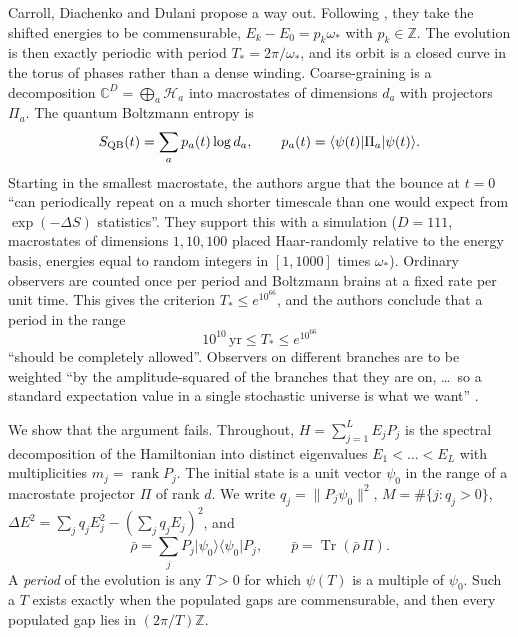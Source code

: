 \documentclass[11pt]{amsart}
\theoremstyle{definition}
\newcommand{\CC}{\mathbb{C}}
\newcommand{\ZZ}{\mathbb{Z}}
\newcommand{\Tr}{\operatorname{Tr}}
\newcommand{\rb}{\bar\rho}
\newcommand{\ket}[1]{\lvert #1\rangle}
\newcommand{\bra}[1]{\langle #1\rvert}
\begin{document}
Carroll, Diachenko and Dulani \cite{CDD26} propose a way out. Following \cite{Car23}, they take the shifted energies to be commensurable, $E_k-E_0=p_k\omega_*$ with $p_k\in\ZZ$. The evolution is then exactly periodic with period $T_*=2\pi/\omega_*$, and its orbit is a closed curve in the torus of phases rather than a dense winding. Coarse-graining is a decomposition $\CC^D=\bigoplus_a\mathcal H_a$ into macrostates of dimensions $d_a$ with projectors $\Pi_a$. The quantum Boltzmann entropy is
\begin{equation}\label{eq:SQB}
S_{\rm QB}(t)=\sum_a p_a(t)\log d_a,\qquad p_a(t)=\langle\psi(t)|\Pi_a|\psi(t)\rangle .
\end{equation}
Starting in the smallest macrostate, the authors argue that the bounce at $t=0$ ``can periodically repeat on a much shorter timescale than one would expect from $\exp(-\Delta S)$ statistics''. They support this with a simulation ($D=111$, macrostates of dimensions $1,10,100$ placed Haar-randomly relative to the energy basis, energies equal to random integers in $[1,1000]$ times $\omega_*$). Ordinary observers are counted once per period and Boltzmann brains at a fixed rate per unit time. This gives the criterion $T_*\le e^{10^{66}}$, and the authors conclude that a period in the range
\begin{equation}\label{eq:window}
10^{10}\,\mathrm{yr}\le T_*\le e^{10^{66}}
\end{equation}
``should be completely allowed''. Observers on different branches are to be weighted ``by the amplitude-squared of the branches that they are on, \dots\ so a standard expectation value in a single stochastic universe is what we want'' \cite[footnote~2]{CDD26}.

We show that the argument fails. Throughout, $H=\sum_{j=1}^{L}E_jP_j$ is the spectral decomposition of the Hamiltonian into distinct eigenvalues $E_1<\dots<E_L$ with multiplicities $m_j=\operatorname{rank}P_j$. The initial state is a unit vector $\psi_0$ in the range of a macrostate projector $\Pi$ of rank $d$. We write $q_j=\|P_j\psi_0\|^2$, $M=\#\{j:q_j>0\}$, $\Delta E^2=\sum_jq_jE_j^2-(\sum_jq_jE_j)^2$, and
\begin{equation}\label{eq:rhobar}
\rb=\sum_jP_j\ket{\psi_0}\bra{\psi_0}P_j,\qquad \bar p=\Tr(\rb\,\Pi).
\end{equation}
A \emph{period} of the evolution is any $T>0$ for which $\psi(T)$ is a multiple of $\psi_0$. Such a $T$ exists exactly when the populated gaps are commensurable, and then every populated gap lies in $(2\pi/T)\ZZ$.
\end{document}

